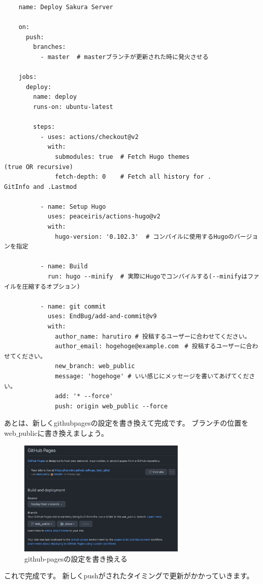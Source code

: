 \begin{tcolorbox}[breakable]
  \begin{verbatim}
    name: Deploy Sakura Server

    on:
      push:
        branches:
          - master  # masterブランチが更新された時に発火させる
    
    jobs:
      deploy:
        name: deploy
        runs-on: ubuntu-latest
        
        steps:
          - uses: actions/checkout@v2
            with:
              submodules: true  # Fetch Hugo themes 
(true OR recursive)
              fetch-depth: 0    # Fetch all history for .
GitInfo and .Lastmod
    
          - name: Setup Hugo
            uses: peaceiris/actions-hugo@v2
            with:
              hugo-version: '0.102.3'  # コンパイルに使用するHugoのバージョンを指定
    
          - name: Build
            run: hugo --minify  # 実際にHugoでコンパイルする(--minifyはファイルを圧縮するオプション)
    
          - name: git commit
            uses: EndBug/add-and-commit@v9
            with:
              author_name: harutiro # 投稿するユーザーに合わせてください。
              author_email: hogehoge@example.com　# 投稿するユーザーに合わせてください。
              new_branch: web_public
              message: 'hogehoge' # いい感じにメッセージを書いてあげてください。
              add: '* --force' 
              push: origin web_public --force
  \end{verbatim}
\end{tcolorbox}

あとは、新しくgithubpagesの設定を書き換えて完成です。
ブランチの位置をweb$\_$publicに書き換えましょう。

\begin{figure}[H]
  \centering
  \includegraphics[width=8cm]{./image/02-chap8/web_public.png}
  \caption{github-pagesの設定を書き換える}
  \label{chap8-web_public-image}
\end{figure}

これで完成です。
新しくpushがされたタイミングで更新がかかっていきます。